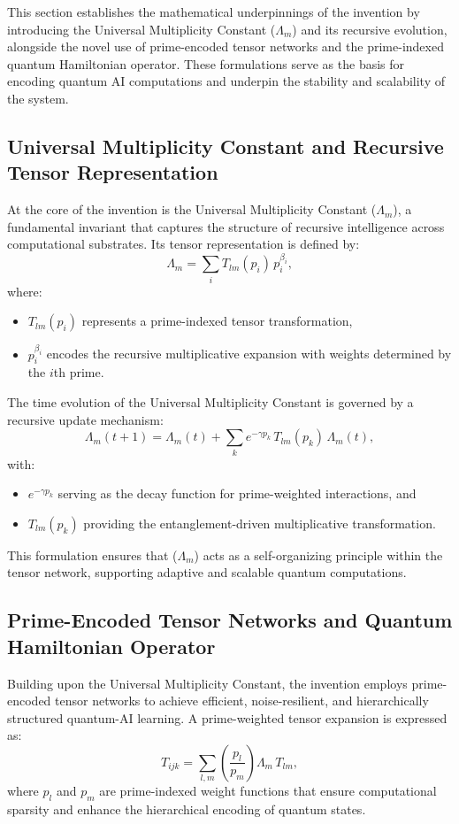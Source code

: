 \documentclass{article}
\theoremstyle{plain}
\begin{document}
\begin{itemize}
This section establishes the mathematical underpinnings of the invention by introducing the Universal Multiplicity Constant ($\Lambda_m$) and its recursive evolution, alongside the novel use of prime-encoded tensor networks and the prime-indexed quantum Hamiltonian operator. These formulations serve as the basis for encoding quantum AI computations and underpin the stability and scalability of the system.

\subsection{Universal Multiplicity Constant and Recursive Tensor Representation}
At the core of the invention is the Universal Multiplicity Constant ($\Lambda_m$), a fundamental invariant that captures the structure of recursive intelligence across computational substrates. Its tensor representation is defined by:
\begin{equation}
\Lambda_m = \sum_{i} T_{lm}(p_i) \, p_i^{\beta_i},
\end{equation}
where:
\begin{itemize}
    \item \(T_{lm}(p_i)\) represents a prime-indexed tensor transformation,
    \item \(p_i^{\beta_i}\) encodes the recursive multiplicative expansion with weights determined by the \(i\)th prime.
\end{itemize}

The time evolution of the Universal Multiplicity Constant is governed by a recursive update mechanism:
\begin{equation}
\Lambda_m(t+1) = \Lambda_m(t) + \sum_{k} e^{-\gamma p_k} \, T_{lm}(p_k) \, \Lambda_m(t),
\end{equation}
with:
\begin{itemize}
    \item \(e^{-\gamma p_k}\) serving as the decay function for prime-weighted interactions, and
    \item \(T_{lm}(p_k)\) providing the entanglement-driven multiplicative transformation.
\end{itemize}
This formulation ensures that ($\Lambda_m$) acts as a self-organizing principle within the tensor network, supporting adaptive and scalable quantum computations.

\subsection{Prime-Encoded Tensor Networks and Quantum Hamiltonian Operator}
Building upon the Universal Multiplicity Constant, the invention employs prime-encoded tensor networks to achieve efficient, noise-resilient, and hierarchically structured quantum-AI learning. A prime-weighted tensor expansion is expressed as:
\begin{equation}
T_{ijk} = \sum_{l,m} \left( \frac{p_l}{p_m} \right) \Lambda_m \, T_{lm},
\end{equation}
where \(p_l\) and \(p_m\) are prime-indexed weight functions that ensure computational sparsity and enhance the hierarchical encoding of quantum states.


\end{itemize}
\end{document}
